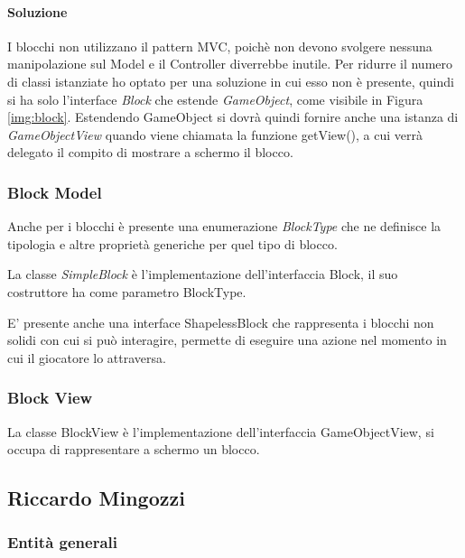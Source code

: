 \documentclass[a4paper,12pt]{report}
\begin{document}
\paragraph{Soluzione} I blocchi non utilizzano il pattern MVC, poichè non devono svolgere nessuna manipolazione sul Model e il Controller diverrebbe inutile.
Per ridurre il numero di classi istanziate ho optato per una soluzione in cui esso non è presente, quindi si ha solo l'interface \emph{Block} che estende \emph{GameObject}, come visibile in Figura \ref{img:block}.
Estendendo GameObject si dovrà quindi fornire anche una istanza di \emph{GameObjectView} quando viene chiamata la funzione getView(), a cui verrà delegato il compito di mostrare a schermo il blocco.

\subsubsection{Block Model}

Anche per i blocchi è presente una enumerazione \emph{BlockType} che ne definisce la tipologia e altre proprietà generiche per quel tipo di blocco.

La classe \emph{SimpleBlock} è l'implementazione dell'interfaccia Block, il suo costruttore ha come parametro BlockType. 

E' presente anche una interface ShapelessBlock che rappresenta i blocchi non solidi con cui si può interagire, permette di eseguire una azione nel momento in cui il giocatore lo attraversa.

\subsubsection{Block View}

La classe BlockView è l'implementazione dell'interfaccia GameObjectView, si occupa di rappresentare a schermo un blocco.

\subsection*{Riccardo Mingozzi}

\subsubsection{Entità generali}
\end{document}
